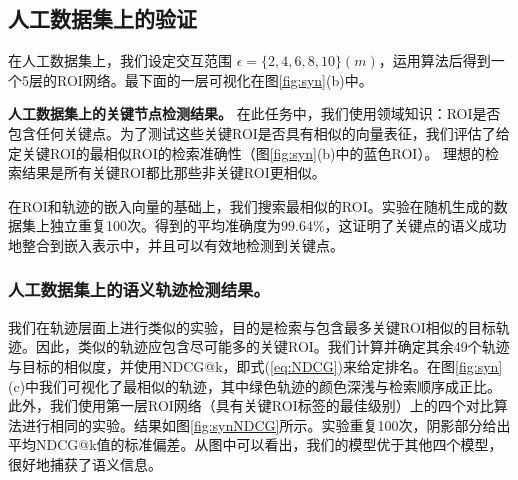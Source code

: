 \subsection{人工数据集上的验证}
在人工数据集上，我们设定交互范围 $\epsilon = \{2,4,6,8,10\}(m)$，运用\CascadeSync 算法后得到一个5层的ROI网络。最下面的一层可视化在图\ref{fig:syn}(b)中。


\vspace{1.5mm}
\textbf{人工数据集上的关键节点检测结果。} 
在此任务中，我们使用领域知识：ROI是否包含任何关键点。为了测试这些关键ROI是否具有相似的向量表征，我们评估了给定关键ROI的最相似ROI的检索准确性（图\ref{fig:syn}(b)中的蓝色ROI）。 理想的检索结果是所有关键ROI都比那些非关键ROI更相似。

在ROI和轨迹的嵌入向量的基础上，我们搜索最相似的ROI。实验在随机生成的数据集上独立重复100次。得到的平均准确度为$\boldsymbol{99.64\%}$，这证明了关键点的语义成功地整合到嵌入表示中，并且可以有效地检测到关键点。


\subsubsection{人工数据集上的语义轨迹检测结果。}
我们在轨迹层面上进行类似的实验，目的是检索与包含最多关键ROI相似的目标轨迹。因此，类似的轨迹应包含尽可能多的关键ROI。我们计算并确定其余49个轨迹与目标的相似度，并使用NDCG@k，即式(\ref{eq:NDCG})来给定排名。在图\ref{fig:syn}(c)中我们可视化了最相似的轨迹，其中绿色轨迹的颜色深浅与检索顺序成正比。此外，我们使用第一层ROI网络（具有关键ROI标签的最佳级别）上的四个对比算法进行相同的实验。结果如图\ref{fig:synNDCG}所示。实验重复100次，阴影部分给出平均NDCG@k值的标准偏差。从图中可以看出，我们的模型优于其他四个模型，很好地捕获了语义信息。


